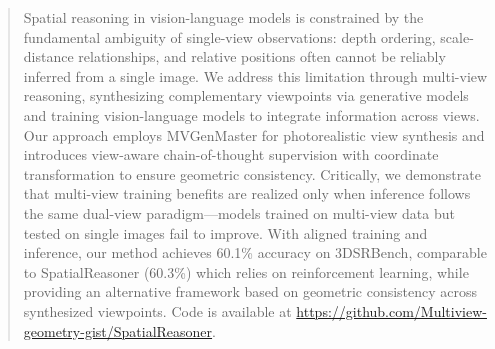\begin{abstract}
Spatial reasoning in vision-language models is constrained by the fundamental ambiguity of single-view observations: depth ordering, scale-distance relationships, and relative positions often cannot be reliably inferred from a single image. We address this limitation through multi-view reasoning, synthesizing complementary viewpoints via generative models and training vision-language models to integrate information across views. Our approach employs MVGenMaster for photorealistic view synthesis and introduces view-aware chain-of-thought supervision with coordinate transformation to ensure geometric consistency. Critically, we demonstrate that multi-view training benefits are realized only when inference follows the same dual-view paradigm---models trained on multi-view data but tested on single images fail to improve. With aligned training and inference, our method achieves 60.1\% accuracy on 3DSRBench, comparable to SpatialReasoner (60.3\%) which relies on reinforcement learning, while providing an alternative framework based on geometric consistency across synthesized viewpoints. Code is available at \url{https://github.com/Multiview-geometry-gist/SpatialReasoner}.
\end{abstract}
